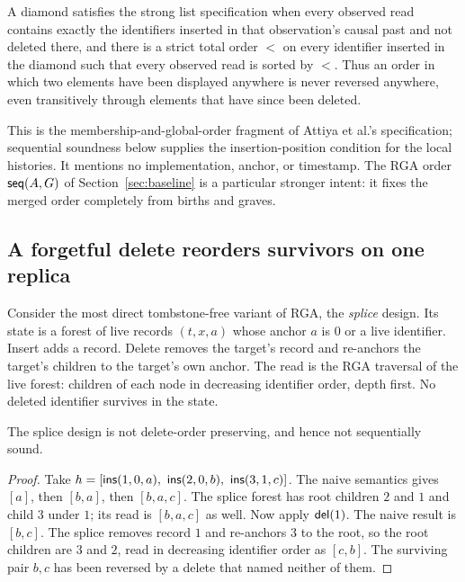 \begin{definition}
A diamond satisfies the strong list specification when every observed read
contains exactly the identifiers inserted in that observation's causal past
and not deleted there, and there is a strict total order $<$ on every
identifier inserted in the diamond such that every observed read is sorted
by $<$. Thus an order in which two elements have been displayed anywhere is
never reversed anywhere, even transitively through elements that have since
been deleted.
\end{definition}

This is the membership-and-global-order fragment of Attiya et
al.'s specification; sequential soundness below supplies the insertion-position
condition for the local histories. It mentions no implementation, anchor, or
timestamp. The RGA order $\mathsf{seq}(A,G)$ of Section~\ref{sec:baseline} is a
particular stronger intent: it fixes the merged order completely from births
and graves.

\subsection{A forgetful delete reorders survivors on one replica}

Consider the most direct tombstone-free variant of RGA, the \emph{splice}
design. Its state is a forest of live records $(t,x,a)$ whose anchor $a$ is
$0$ or a live identifier. Insert adds a record. Delete removes the target's
record and re-anchors the target's children to the target's own anchor. The
read is the RGA traversal of the live forest: children of each node in
decreasing identifier order, depth first. No deleted identifier survives in
the state.

\begin{proposition}
\label{prop:reorder}
The splice design is not delete-order preserving, and hence not
sequentially sound.
\end{proposition}

\begin{proof}
Take $h=[\ins(1,0,a),\ \ins(2,0,b),\ \ins(3,1,c)]$. The naive semantics
gives $[a]$, then $[b,a]$, then $[b,a,c]$. The splice forest has root
children $2$ and $1$ and child $3$ under $1$; its read is $[b,a,c]$ as well.
Now apply $\mathsf{del}(1)$. The naive result is $[b,c]$. The splice removes record
$1$ and re-anchors $3$ to the root, so the root children are $3$ and $2$,
read in decreasing identifier order as $[c,b]$. The surviving pair $b,c$ has
been reversed by a delete that named neither of them.
\end{proof}

